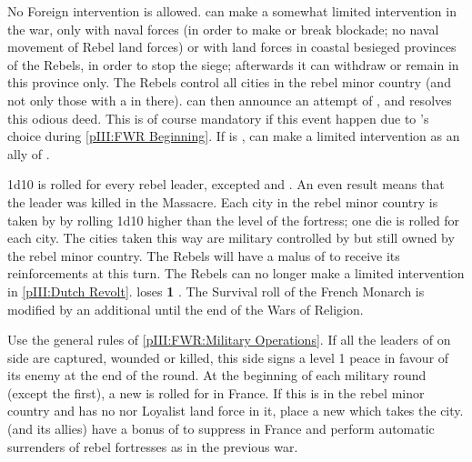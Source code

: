 \phdipl
\aparag No Foreign intervention is allowed.
\aparag \REB can make a somewhat limited intervention in the war, only with
naval forces (in order to make or break blockade; no naval movement of Rebel
land forces) or with land forces in coastal besieged provinces of the Rebels,
in order to stop the siege; afterwards it can withdraw or remain in this
province only.
\aparag The Rebels control all cities in the rebel minor country (and not only
those with a \REVOLT in there).
\aparag \FRA can then announce an attempt of
, and resolves this odious deed. This is
of course mandatory if this event happen due to \FRA's choice during
\ref{pIII:FWR Beginning}.
\aparag If \FRA is \CATHCR, \LIG can make a limited intervention as an ally of
\FRA.

\begin{digressions}



  \phdipl
  \aparag 1d10 is rolled for every rebel leader, excepted  and \leaderNavarre. An even result means that the leader was killed
  in the Massacre.
  \aparag Each city in the rebel minor country is taken by \FRA by rolling
  1d10 higher than the level of the fortress; one die is rolled for each
  city. The cities taken this way are military controlled by \FRA but still
  owned by the rebel minor country.
  \aparag The Rebels will have a malus of  to receive its
  reinforcements at this turn.
  \aparag The Rebels can no longer make a limited intervention in
  \ref{pIII:Dutch Revolt}.
  \aparag \FRA loses {\bf 1} \STAB.
  \aparag The Survival roll of the French Monarch is modified by an additional
   until the end of the Wars of Religion.



  \phmil
  \aparag Use the general rules of \ref{pIII:FWR:Military Operations}.
  \aparag If all the leaders of on side are captured, wounded or killed, this
  side signs a level 1 peace in favour of its enemy at the end of the round.
  \aparag At the beginning of each military round (except the first), a new
  \REVOLT is rolled for in France. If this \REVOLT is in the rebel minor
  country and has no \REVOLT nor Loyalist land force in it, place a new
  \REVOLT \facemoins which takes the city.
  \aparag \FRA (and its allies) have a bonus of  to suppress \REVOLT
  in France and perform automatic surrenders of rebel fortresses as in the
  previous war.
\end{digressions}

